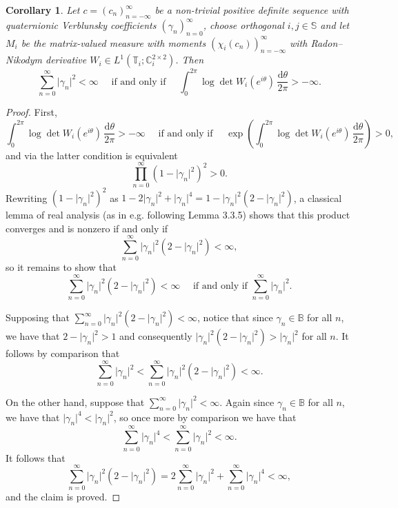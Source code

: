 \documentclass[11pt,reqno]{amsart}
\def\x{\chi}
\def\g{\gamma}
\def\th{\theta}
\def\rmd{\mathrm{d}}
\def\CC{\mathbb{C}}
\def\BB{\mathbb{B}}
\def\SS{\mathbb{S}}
\def\TT{\mathbb{T}}
\newtheorem{corollary}[theorem]{Corollary}
\theoremstyle{definition}
\numberwithin{equation}{section}
\begin{document}
\begin{corollary}
\label{cor:SVConvergence}
    Let \(c = (c_n)_{n=-\infty}^{\infty}\) be a non-trivial positive definite sequence with quaternionic Verblunsky coefficients \((\g_n)_{n=0}^{\infty}\), choose orthogonal \(i,j\in\SS\) and let \(M_i\) be the matrix-valued measure with moments \((\x_i(c_n))_{n=-{\infty}}^{\infty}\) with Radon--Nikodym derivative \(W_i \in L^1(\TT_i; \CC_i^{2\times2})\). Then
    \[
        \sum_{n=0}^{\infty} \lvert \g_n \rvert^2 < \infty \quad \text{ if and only if } \quad \int_0^{2\pi} \log \det W_i(e^{i\th}) \, \frac{\rmd\th}{2\pi} > -\infty.
    \]
\end{corollary}
\begin{proof}
    First,
    \[
        \int_0^{2\pi} \log \det W_i(e^{i\th}) \, \frac{\rmd\th}{2\pi} > -\infty \quad \text{ if and only if } \quad \exp\left(\int_0^{2\pi} \log \det W_i(e^{i\th}) \, \frac{\rmd\th}{2\pi}\right) > 0,
    \]
    and via  the latter condition is equivalent
    \[
        \prod_{n=0}^{\infty} (1 - \lvert \g_n \rvert^2)^2 > 0.
    \]
    Rewriting \((1 - \lvert \g_n \rvert^2)^{2}\) as \(1 - 2\lvert \g_n \rvert^2 + \lvert \g_n \rvert^4 = 1 - \lvert \g_n \rvert^2 (2 - \lvert \g_n \rvert^2)\), a classical lemma of real analysis (as in e.g. \cite{Kat04} following Lemma 3.3.5) shows that this product converges and is nonzero if and only if
    \[
        \sum_{n=0}^{\infty} \lvert \g_n \rvert^2 (2 - \lvert \g_n \rvert^2) < \infty,
    \]
    so it remains to show that
    \[
        \sum_{n=0}^{\infty} \lvert \g_n \rvert^2 (2 - \lvert \g_n \rvert^2) < \infty \quad \text{ if and only if } \sum_{n=0}^{\infty} \lvert \g_n \rvert^2.
    \]

    Supposing that \(\sum_{n=0}^{\infty} \lvert \g_n \rvert^2 (2 - \lvert \g_n \rvert^2) < \infty\), notice that since \(\g_n \in \BB\) for all \(n\), we have that \(2 - \lvert \g_n \rvert^2 > 1\) and consequently \(\lvert \g_n \rvert^2 (2 - \lvert \g_n \rvert^2) > \lvert \g_n \rvert^2\) for all \(n\). It follows by comparison that
    \[
        \sum_{n=0}^{\infty} \lvert \g_n \rvert^2 < \sum_{n=0}^{\infty} \lvert \g_n \rvert^2 (2 - \lvert \g_n \rvert^2) < \infty.
    \]

    On the other hand, suppose that \(\sum_{n=0}^{\infty} \lvert \g_n \rvert^2 < \infty\). Again since \(\g_n \in \BB\) for all \(n\), we have that \(\lvert \g_n \rvert^4 < \lvert \g_n \rvert^2\), so once more by comparison we have that
    \[
        \sum_{n=0}^{\infty} \lvert \g_n \rvert^4 < \sum_{n=0}^{\infty} \lvert \g_n \rvert^2 < \infty.
    \]
    It follows that
    \[
        \sum_{n=0}^{\infty} \lvert \g_n \rvert^2 (2 - \lvert \g_n \rvert^2) = 2\sum_{n=0}^{\infty} \lvert \g_n \rvert^2 + \sum_{n=0}^{\infty} \lvert \g_n \rvert^4 < \infty,
    \]
    and the claim is proved.
    
\end{proof}
\end{document}
